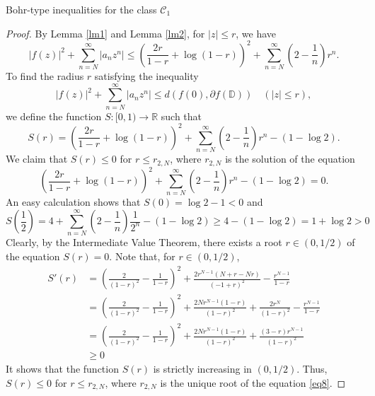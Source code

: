 \documentclass[12pt,a4paper,reqno]{amsart}
\theoremstyle{definition}
\theoremstyle{plain}
\numberwithin{equation}{section}
\begin{document}
\begin{section}{Bohr-type inequalities for the class $\mathcal{C}_1$}
\begin{proof}
 By Lemma \ref{lm1} and Lemma \ref{lm2}, for $|z| \le r$,
we have
\begin{equation*}
|f(z)|^2+ \sum_{n=N}^{\infty} |a_n z^n|  \le
 \left( \frac{2r}{1-r} +\log(1-r) \right)^2 + \sum_{n=N}^{\infty}  \left( 2-\frac{1}{n} \right) r^{n}.
\end{equation*}
To find the radius $r$ satisfying the inequality
\begin{equation*}
|f(z)|^2+ \sum_{n=N}^{\infty} |a_n z^n|  \le d(f(0), \partial{f(\mathbb{D})})\quad (|z|\leq r),
\end{equation*}
we define the function $S:[0, 1)\rightarrow\mathbb{R}$ such that
\begin{equation*}
S(r)=\left(\frac{2r}{1-r} +\log(1-r) \right)^2 + \sum_{n=N}^{\infty} \left( 2-\frac{1}{n} \right) r^{n}- (1 - \log{2}).
\end{equation*}
We claim that $S(r)\leq 0$ for $r \le r_{2,N}$, where $r_{2,N}$ is the solution of the equation
\begin{equation}\label{eq8}
\left(\frac{2r}{1-r} +\log(1-r) \right)^2 + \sum_{n=N}^{\infty} \left( 2-\frac{1}{n} \right) r^{n}- (1 - \log{2})=0.
\end{equation}
An easy calculation shows that $S(0)=\log2-1<0$ and
\[S\left(\frac{1}{2}\right)=4+\sum_{n=N}^{\infty} \left( 2-\frac{1}{n} \right) \frac{1}{2^{n}}- (1 - \log{2})
\geq4-(1-\log2)
=1+\log2
>0\]
 Clearly, by the Intermediate Value Theorem, there exists a root $r\in(0, 1/2)$  of the equation $S(r)=0$. Note that, for $r\in(0, 1/2)$,
 \begin{align*}S'(r)&=\left(\frac{2}{(1-r)^2}-\frac{1}{1-r}\right)^2+\frac{2 r^{N-1} (N+r-N r)}{(-1+r)^2}-\frac{r^{N-1}}{1-r}\\
 &=\left(\frac{2}{(1-r)^2}-\frac{1}{1-r}\right)^2+\frac{2N r^{N-1}(1-r) }{(1-r)^2}+\frac{2r^N}{(1-r)^2}-\frac{r^{N-1}}{1-r}\\
 &=\left(\frac{2}{(1-r)^2}-\frac{1}{1-r}\right)^2+\frac{2N r^{N-1}(1-r) }{(1-r)^2}+\frac{(3-r)r^{N-1}}{(1-r)^2}\\
 &\geq0
 \end{align*}
It shows that the function $S(r)$ is strictly increasing in $(0, 1/2)$. Thus, $S(r)\leq 0$ for $r \le r_{2,N}$, where $r_{2,N}$ is the unique root of the equation \eqref{eq8}.


\end{proof}
\end{section}
\end{document}

